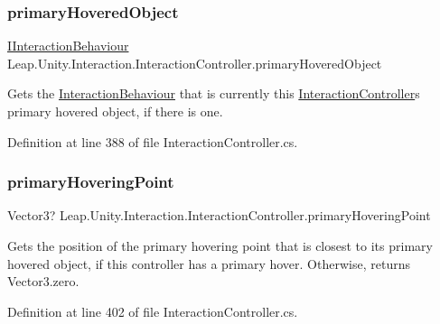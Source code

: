 \subsubsection{\texorpdfstring{primaryHoveredObject}{primaryHoveredObject}}
{\footnotesize\ttfamily \mbox{\hyperlink{interface_leap_1_1_unity_1_1_interaction_1_1_i_interaction_behaviour}{I\+Interaction\+Behaviour}} Leap.\+Unity.\+Interaction.\+Interaction\+Controller.\+primary\+Hovered\+Object\hspace{0.3cm}{\ttfamily [get]}}



Gets the \mbox{\hyperlink{class_leap_1_1_unity_1_1_interaction_1_1_interaction_behaviour}{Interaction\+Behaviour}} that is currently this \mbox{\hyperlink{class_leap_1_1_unity_1_1_interaction_1_1_interaction_controller}{Interaction\+Controller}}\textquotesingle{}s primary hovered object, if there is one. 



Definition at line 388 of file Interaction\+Controller.\+cs.

\mbox{\label{class_leap_1_1_unity_1_1_interaction_1_1_interaction_controller_a554d29bd982480dc182546ef3ed72c23}} 
\subsubsection{\texorpdfstring{primaryHoveringPoint}{primaryHoveringPoint}}
{\footnotesize\ttfamily Vector3? Leap.\+Unity.\+Interaction.\+Interaction\+Controller.\+primary\+Hovering\+Point\hspace{0.3cm}{\ttfamily [get]}}



Gets the position of the primary hovering point that is closest to its primary hovered object, if this controller has a primary hover. Otherwise, returns Vector3.\+zero. 



Definition at line 402 of file Interaction\+Controller.\+cs.

\mbox{\label{class_leap_1_1_unity_1_1_interaction_1_1_interaction_controller_aaf9e4b9336f1afd0e0043bc0cffe8aeb}} 
